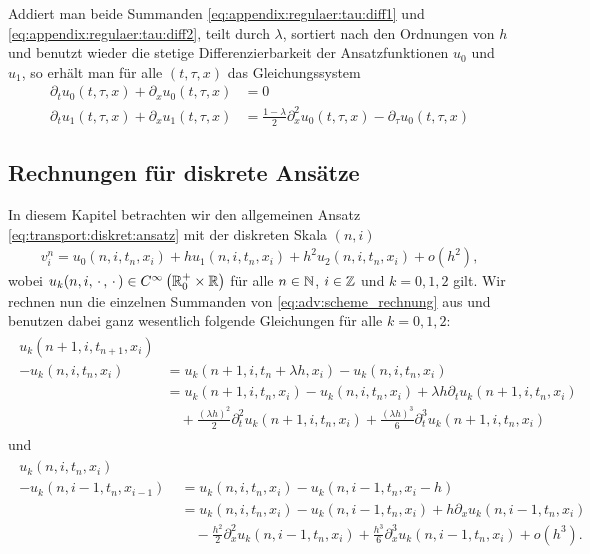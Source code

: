 Addiert man beide Summanden \eqref{eq:appendix:regulaer:tau:diff1} und \eqref{eq:appendix:regulaer:tau:diff2}, teilt durch $\lambda$, sortiert nach den Ordnungen von $h$ und benutzt wieder die stetige Differenzierbarkeit der Ansatzfunktionen $u_0$ und $u_1$, so erhält man für alle $(t, \tau, x)$ das Gleichungssystem
\begin{align}\label{eq:appendix:regulaer:tau:oh}
\partial_t u_0(t, \tau, x) + \partial_x u_0(t, \tau, x) &= 0\\
\partial_t u_1(t, \tau, x) + \partial_x u_1(t, \tau, x) &= \frac{1-\lambda}{2} \partial^2_x u_0(t, \tau, x) - \partial_\tau u_0(t, \tau, x) \label{eq:appendix:regulaer:tau:oh2}
\end{align}

\subsection{Rechnungen für diskrete Ansätze}
\label{appendix:diskret:summanden}
In diesem Kapitel betrachten wir den allgemeinen Ansatz \eqref{eq:transport:diskret:ansatz} mit der diskreten Skala $(n,i)$
\begin{align*}
v^n_i = u_0(n, i, t_n, x_i) + h u_1(n, i, t_n, x_i) + h^2 u_2(n, i, t_n, x_i) + o(h^2),
\end{align*}
wobei $u_k(n, i, \, \cdot \,, \, \cdot \,) \in C^\infty\left( \mathbb R^+_0 \times \mathbb R \right)$ für alle $n \in \mathbb N$, $i \in \mathbb Z$ und $k=0,1,2$ gilt.
Wir rechnen nun die einzelnen Summanden von \eqref{eq:adv:scheme_rechnung} aus und benutzen dabei ganz wesentlich folgende Gleichungen für alle $k = 0,1,2$:
\begin{align}\label{apx:diskret:lemma1}
\begin{split}
u_k(n+1, i, t_{n+1}, x_i)\\
- u_k(n, i, t_n, x_i)
&= u_k(n+1, i, t_n + \lambda h, x_i) - u_k(n, i, t_n, x_i)\\
&= u_k(n+1, i, t_n, x_i) - u_k(n, i, t_n, x_i) + \lambda h \partial_t u_k(n+1, i, t_n, x_i)\\
&\quad + \frac{(\lambda h)^2}{2} \partial^2_t u_k(n+1, i, t_n, x_i) + \frac{(\lambda h)^3}{6} \partial^3_t u_k(n+1, i, t_n, x_i)
\end{split}
\end{align}
und
\begin{align}
\begin{split}\label{apx:diskret:lemma2}
u_k(n, i, t_n, x_i)\qquad \qquad&\\
- u_k(n, i-1, t_n, x_{i-1})
&= u_k(n, i, t_n, x_i) - u_k(n, i-1, t_n, x_i - h)\\
&= u_k(n, i, t_n, x_i) - u_k(n, i-1, t_n, x_i) + h \partial_x u_k(n, i-1, t_n, x_i)\\
&\quad - \frac{h^2}{2} \partial^2_x u_k(n, i-1, t_n, x_i) + \frac{h^3}{6} \partial^3_x u_k(n, i-1, t_n, x_i) + o(h^3).
\end{split}
\end{align}
